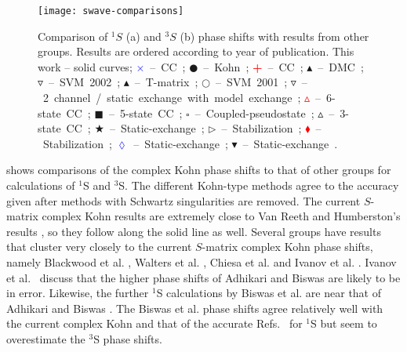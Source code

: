 \documentclass[Dissertation.tex]{subfiles}
\begin{document}
\begin{figure}
	\centering
	\texttt{[image: swave-comparisons]}
	\caption[Comparison of $^1S$ and $^3S$ phase shifts]{Comparison of $^1S$ (a) and $^3S$ (b) phase shifts
with results from other groups. Results are ordered according to year of
publication. This work -- solid curves;
\mbox{\textcolor{blue}{$\times$} -- CC \cite{Walters2004};}
\mbox{$\CIRCLE$ -- Kohn \cite{VanReeth2003};}
\mbox{\textcolor{red}{\textbf{+}} -- CC \cite{Blackwood2002};}
\mbox{$\blacktriangle$ -- DMC \cite{Chiesa2002};} 
\mbox{$\triangledown$ -- SVM 2002 \cite{Ivanov2002};} 
\mbox{\textcolor[RGB]{0,127,0}{$\blacktriangle$} -- T-matrix \cite{Biswas2002a};} 
\mbox{$\Circle$ -- SVM 2001 \cite{Ivanov2001};} 
\mbox{\textcolor[RGB]{0,127,0}{$\triangledown$} -- 2 channel / static exchange with model exchange \cite{Biswas2001};} 
\mbox{\textcolor{red}{$\vartriangle$} -- 6-state CC \cite{Sinha2000};} 
\mbox{$\blacksquare$ -- 5-state CC \cite{Adhikari1999};} 
\mbox{$\square$ -- Coupled-pseudostate \cite{Campbell1998};} 
\mbox{$\vartriangle$ -- 3-state CC \cite{Sinha1997};} 
\mbox{\textcolor[RGB]{0,127,0}{$\bigstar$} -- Static-exchange \cite{Ray1997};} 
\mbox{$\triangleright$ -- Stabilization \cite{Drachman1976};} 
\mbox{\textcolor{red}{$\blacklozenge$} -- Stabilization \cite{Drachman1975};}
\mbox{\textcolor{blue}{$\lozenge$} -- Static-exchange \cite{Hara1975};}
\mbox{$\blacktriangledown$ -- Static-exchange \cite{Fraser1961}.}}
	\label{fig:SWaveComparisons}
\end{figure}


 shows comparisons of the complex Kohn phase 
shifts to that of other groups for calculations of $^1$S and $^3$S. The
different Kohn-type methods agree to the accuracy given after methods with
Schwartz singularities are removed. The current $S$-matrix complex Kohn results are extremely close to Van
Reeth and Humberston's results \cite{VanReeth2003}, so they 
follow along the solid line as well. Several groups have results that cluster 
very closely to the current $S$-matrix complex Kohn phase shifts, namely Blackwood et al. \cite{Blackwood2002}, Walters 
et al. \cite{Walters2004}, Chiesa et al. \cite{Chiesa2002} and Ivanov et al. \cite{Ivanov2002}. 
Ivanov et al.\ \cite{Ivanov2002} discuss that the higher phase shifts of
Adhikari and Biswas \cite{Adhikari1999} are likely to be in error. Likewise, 
the further $^1$S calculations by Biswas et al. \cite{Biswas2002a} are near 
that of Adhikari and Biswas \cite{Adhikari1999}. The Biswas et al. \cite{Biswas2001} phase shifts 
agree relatively well with the current complex Kohn and that of the accurate 
Refs.~\cite{Blackwood2002,VanReeth2003,Walters2004} for $^1$S but seem to 
overestimate the $^3$S phase shifts.
\end{document}
